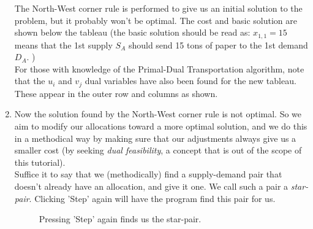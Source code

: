 \documentclass[a4paper,12pt]{article}
\begin{document}
\begin{enumerate}
The North-West corner rule is performed to give us an initial solution to the problem, but it probably won't be optimal. The cost and basic solution are shown below the tableau (the basic solution should be read as: $x_{1,1} = 15$ means that the 1st supply $S_A$ should send 15 tons of paper to the 1st demand $D_A$. )\\ 

For those with knowledge of the Primal-Dual Transportation algorithm, note that the $u_i$ and $v_j$ dual variables have also been found for the new tableau. These appear in the outer row and columns as shown. \\

\newpage

\item
Now the solution found by the North-West corner rule is not optimal. So we aim to modify our allocations toward a more optimal solution, and we do this in a methodical way by making sure that our adjustments always give us a smaller cost (by seeking \textit{dual feasibility}, a concept that is out of the scope of this tutorial).\\

Suffice it to say that we (methodically) find a supply-demand pair that doesn't already have an allocation, and give it one. We call such a pair a \textit{star-pair}. Clicking 'Step' again will have the program find this pair for us.\\

 \begin{figure}[h!]
\centering
{}
\caption{Pressing 'Step' again finds us the star-pair.}
\end{figure} 


\end{enumerate}
\end{document}
